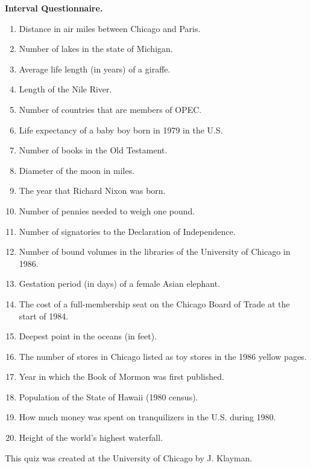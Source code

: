 \documentclass[12pt]{extarticle}
\begin{document}
{\bf Interval Questionnaire.}

\begin{enumerate}
\item Distance in air miles between Chicago and Paris.

\item Number of lakes in the state of Michigan.

\item Average life length (in years) of a giraffe.

\item Length of the Nile River.

\item Number of countries that are members of OPEC.

\item Life expectancy of a baby boy born in 1979 in the U.S.

\item Number of books in the Old Testament.

\item Diameter of the moon in miles.

\item The year that Richard Nixon was born.
\item
 Number of pennies needed to weigh one pound.
\item
 Number of signatories to the Declaration of Independence.
\item
 Number of bound volumes in the libraries of the University of
Chicago in 1986.
\item
 Gestation period (in days) of a female Asian elephant.
\item
 The cost of a full-membership seat on the Chicago Board of Trade
at the start of 1984.
\item
Deepest point in the oceans (in feet).
\item
The number of stores in Chicago listed as toy stores in the 1986
yellow pages. 
\item
Year in which the Book of Mormon was first published.
\item
Population of the State of Hawaii (1980 census).
\item
How much money was spent on tranquilizers in the U.S. during
1980. 
\item
Height of the world's highest waterfall.  
\end{enumerate}


  This quiz was created at the University of Chicago by J. Klayman.
\end{document}
